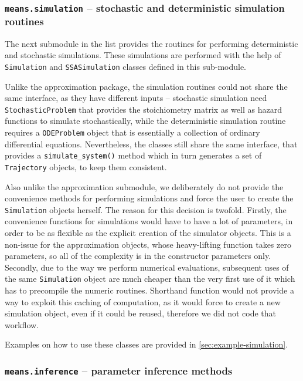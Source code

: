 \subsubsection{{\tt means.simulation} -- stochastic and deterministic simulation routines}

The next submodule in the list provides the routines for performing deterministic and stochastic simulations. These simulations are performed with the help of \verb"Simulation" and \verb"SSASimulation" classes defined in this sub-module.

Unlike the approximation package, the simulation routines could not share the same interface, as they have different inputs -- stochastic simulation need \verb"StochasticProblem" that provides the stoichiometry matrix as well as hazard functions to simulate stochastically, while the deterministic simulation routine requires a \verb"ODEProblem" object that is essentially a collection of ordinary differential equations.
Nevertheless, the classes still share the same interface, that provides a \verb"simulate_system()" method which in turn generates a set of \verb"Trajectory" objects, to keep them consistent.

Also unlike the approximation submodule, we deliberately do not provide the convenience methods for performing simulations and force the user to create the \verb"Simulation" objects herself. 
The reason for this decision is twofold. 
Firstly, the convenience functions for simulations would have to have a lot of parameters, in order to be as flexible as the explicit creation of the simulator objects. 
This is a non-issue for the approximation objects, whose heavy-lifting function takes zero parameters, so all of the complexity is in the constructor parameters only.
Secondly, due to the way we perform numerical evaluations, subsequent uses of the same \verb"Simulation" object are much cheaper than the very first use of it which has to precompile the numeric routines. 
Shorthand function would not provide a way to exploit this caching of computation, as it would force to create a new simulation object, even if it could be reused, therefore we did not code that workflow.

Examples on how to use these classes are provided in \autoref{sec:example-simulation}.

\subsubsection{{\tt means.inference} -- parameter inference methods}
